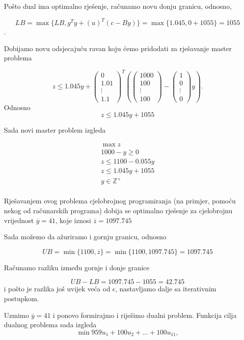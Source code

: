 \documentclass[b5paper, utf8, 11pt, colorlinks]{book}
\theoremstyle{definition}
\begin{document}
Pošto dual ima optimalno rješenje, računamo novu donju granicu, odnosno,


$$LB = \max\{LB,g^Ty+(u)^T(c-By)\}=\max\{1.045,0+ 1055\} = 1055$$.

Dobijamo novu odsjecajuću ravan koju ćemo pridodati za rješavanje master problema

$$z\leqslant 1.045y+\left(\begin{array}{c}
	0\\
	1.01 \\
	\vdots \\
	1.1
\end{array}\right)^T
\left(\left(\begin{array}{c}
	1000 \\
	100 \\
	\vdots \\
	100
\end{array}\right)-\left(\begin{array}{c}
	1 \\
	0 \\
	\vdots \\
	0
\end{array}\right)y\right).$$
Odnosno 
$$z\leqslant 1.045y+1055$$

Sada novi master problem izgleda 


$$
\begin{aligned}
	\max z\\
	1000-y\geqslant 0\\
	z\leqslant 1100-0.055y\\ 
	z\leqslant 1.045y+1055\\
	y\in\mathbb{Z}^+\\	
\end{aligned}
$$


Rješavanjem ovog problema cjelobrojnog programiranja (na primjer, pomoću nekog od računarskih programa) dobija se optimalno rješenje za cjelobrojnu vrijednost $\overline{y}=41$, koje iznosi $\overline{z} = 1097.745$

Sada možemo da ažuriramo i gornju granicu, odnosno 

$$UB = \min\{1100,\overline{z}\} =  \min\{1100,1097.745\} =1097.745$$

Računamo razliku između gornje i donje granice

$$UB-LB=1097.745-1055 = 42.745$$
i pošto je razlika još uvijek veća od $\epsilon$, nastavljamo dalje sa iterativnim postupkom.

Uzmimo $\overline{y}=41$ i ponovo formirajmo i riješimo dualni problem. 
Funkcija cilja dualnog problema sada izgleda 
$$\min 959u_1+ 100u_2+\ldots+100u_{11},$$
\end{document}
